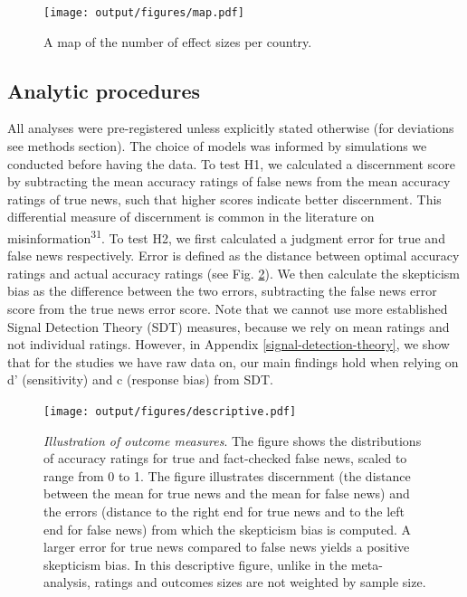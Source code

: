 \documentclass[
  doc,floatsintext]{apa6}
\begin{document}
\begin{figure}
\centering
\texttt{[image: output/figures/map.pdf]}
\caption{\label{fig:map}A map of the number of effect sizes per country.}
\end{figure}

\subsection{Analytic procedures}\label{analytic-procedures}

All analyses were pre-registered unless explicitly stated otherwise (for deviations see methods section). The choice of models was informed by simulations we conducted before having the data. To test H1, we calculated a discernment score by subtracting the mean accuracy ratings of false news from the mean accuracy ratings of true news, such that higher scores indicate better discernment. This differential measure of discernment is common in the literature on misinformation\textsuperscript{31}. To test H2, we first calculated a judgment error for true and false news respectively. Error is defined as the distance between optimal accuracy ratings and actual accuracy ratings (see Fig. \ref{fig:descriptive}). We then calculate the skepticism bias as the difference between the two errors, subtracting the false news error score from the true news error score. Note that we cannot use more established Signal Detection Theory (SDT) measures, because we rely on mean ratings and not individual ratings. However, in Appendix \ref{signal-detection-theory}, we show that for the studies we have raw data on, our main findings hold when relying on d' (sensitivity) and c (response bias) from SDT.



\begin{figure}
\centering
\texttt{[image: output/figures/descriptive.pdf]}
\caption{\label{fig:descriptive}\emph{Illustration of outcome measures}. The figure shows the distributions of accuracy ratings for true and fact-checked false news, scaled to range from 0 to 1. The figure illustrates discernment (the distance between the mean for true news and the mean for false news) and the errors (distance to the right end for true news and to the left end for false news) from which the skepticism bias is computed. A larger error for true news compared to false news yields a positive skepticism bias. In this descriptive figure, unlike in the meta-analysis, ratings and outcomes sizes are not weighted by sample size.}
\end{figure}
\end{document}
